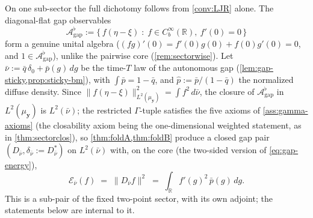 \documentclass[reqno,final,11pt]{amsart}
\theoremstyle{plain}
\theoremstyle{definition}
\theoremstyle{remark}
\newcommand{\R}{\mathbb R}
\newcommand{\cA}{\mathcal A}
\newcommand{\cE}{\mathcal E}
\begin{document}
On one sub-sector the full dichotomy follows from \cref{conv:LJR} alone. The
diagonal-flat gap observables
\[
  \cA^{\flat}_{\mathrm{gap}}:=\bigl\{\,f(\eta-\xi)\;:\;f\in C_b^\infty(\R),\
  f'(0)=0\,\bigr\}
\]
form a genuine unital algebra ($(fg)'(0)=f'(0)g(0)+f(0)g'(0)=0$, and
$1\in\cA^{\flat}_{\mathrm{gap}}$), unlike the pairwise core
(\cref{rem:sectorwise}). Let $\bar\nu:=\bar q\,\delta_0+\bar p(g)\,dg$ be the
time-$T$ law of the autonomous gap (\cref{lem:gap-sticky,prop:sticky-bm}), with
$\int\bar p=1-\bar q$, and $\hat p:=\bar p/(1-\bar q)$ the normalized diffuse
density. Since $\|f(\eta-\xi)\|^2_{L^2(\mu_{\mathbf y})}=\int f^2\,d\bar\nu$,
the closure of $\cA^{\flat}_{\mathrm{gap}}$ in $L^2(\mu_{\mathbf y})$ is
$L^2(\bar\nu)$; the restricted $\Gamma$-tuple satisfies the five axioms of
\cref{ass:gamma-axioms} (the closability axiom being the one-dimensional
weighted statement, as in \cref{thm:sectorclos}), so
\cref{thm:foldA,thm:foldB} produce a closed gap pair
$(D_{\bar\nu},\delta_{\bar\nu}:=D_{\bar\nu}^{*})$ on $L^2(\bar\nu)$ with, on the
core (the two-sided version of \eqref{eq:gap-energy}),
\[
  \cE_{\bar\nu}(f)\;=\;\|D_{\bar\nu}f\|^2\;=\;\int_\R f'(g)^2\,\bar p(g)\,dg .
\]
This is a sub-pair of the fixed two-point sector, with its own adjoint; the
statements below are internal to it.
\end{document}
